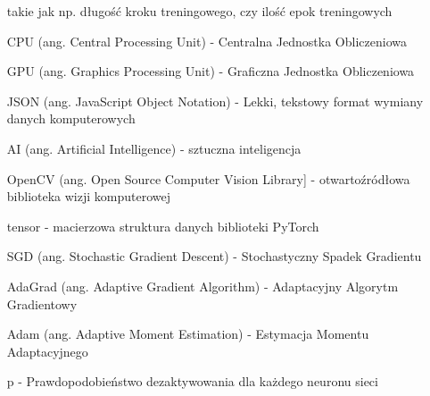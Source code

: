 \begin{itemize}
    takie jak np. długość kroku treningowego, czy ilość epok treningowych
    \item[CPU] (ang. Central Processing Unit) - Centralna Jednostka Obliczeniowa
    \item[GPU] (ang. Graphics Processing Unit) - Graficzna Jednostka Obliczeniowa
    \item[JSON] (ang. JavaScript Object Notation) - Lekki, tekstowy format wymiany danych komputerowych
    \item[AI] (ang. Artificial Intelligence) - sztuczna inteligencja
    \item[OpenCV] (ang. Open Source Computer Vision Library] - otwartoźródłowa biblioteka wizji komputerowej
    \item[tensor] - macierzowa struktura danych biblioteki PyTorch
    \item[SGD] (ang. Stochastic Gradient Descent) - Stochastyczny Spadek Gradientu
    \item[AdaGrad] (ang. Adaptive Gradient Algorithm) - Adaptacyjny Algorytm Gradientowy
    \item[Adam] (ang. Adaptive Moment Estimation) - Estymacja Momentu Adaptacyjnego
    \item[p] - Prawdopodobieństwo dezaktywowania dla każdego neuronu sieci



  \end{itemize}
